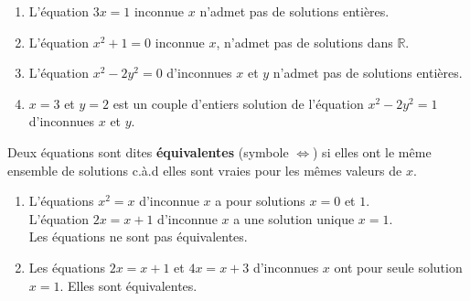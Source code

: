 \begin{example}\hfill
	\begin{enumerate}[label=\alph*),leftmargin=*]
		\item L'équation $3x=1$ inconnue $x$ n'admet pas de solutions entières.
		\item L'équation $x^2+1=0$ inconnue $x$, n'admet pas de solutions dans $\mathbb{R}$.
		\item L'équation $x^2-2y^2=0$ d'inconnues $x$ et $y$ n'admet pas de solutions entières.
		\item $x=3$ et $y=2$ est un couple d'entiers solution de l'équation $x^2-2y^2=1$ d'inconnues $x$ et $y$.
	\end{enumerate}
\end{example}

\begin{definition}
	Deux équations sont dites \textbf{équivalentes} (symbole $\iff$) si elles ont le même ensemble de solutions c.à.d elles sont vraies pour les mêmes valeurs de $x$.
\end{definition} 
\begin{example}\hfill 
	\begin{enumerate}[label=\alph*),leftmargin=*]
		\item L'équations $x^2=x$ d'inconnue $x$ a pour solutions $x=0$ et $1$.\\
		L'équation $2x=x+1$ d'inconnue $x$ a une solution unique $x=1$.\\
		Les équations ne sont pas équivalentes.
		\item Les équations $2x=x+1$ et $4x=x+3$ d'inconnues $x$ ont pour seule solution  $x=1$. Elles sont équivalentes.
	\end{enumerate}
\end{example}

%	
%	

